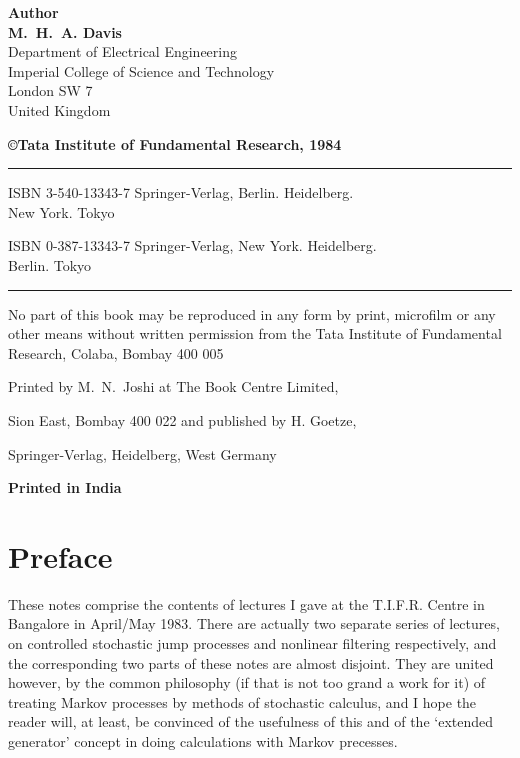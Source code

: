\thispagestyle{empty}
\begin{center}
{\bf Author}\\[15pt]
{\large\bf M.~H.~A. Davis}\\
{Department of Electrical Engineering}\\
{Imperial College of Science and Technology}\\
{London SW 7}\\
{United Kingdom}
\vfill

{\bf\copyright Tata Institute of Fundamental Research, 1984}
\vfill

\rule{\textwidth}{.5pt}

ISBN 3-540-13343-7 Springer-Verlag, Berlin. Heidelberg.\\ New York. Tokyo

ISBN 0-387-13343-7 Springer-Verlag, New York. Heidelberg.\\ Berlin. Tokyo

\rule{\textwidth}{.5pt}

\vfill


\parbox{0.7\textwidth}{
No part of this book may be reproduced in any form by print, microfilm
or any other means without written permission from the Tata Institute
of Fundamental Research, Colaba, Bombay 400 005}
\vfill

Printed by M.~N.~Joshi at The Book Centre Limited,

Sion East, Bombay 400 022 and published by H. Goetze,

Springer-Verlag, Heidelberg, West Germany


\vskip 1cm

{\bf Printed in India}
\end{center}
\eject

\chapter*{Preface}

These notes comprise the contents of lectures I gave at the
T.I.F.R. Centre in Bangalore in April/May 1983. There are actually two
separate series of lectures, on controlled stochastic jump processes
and nonlinear filtering respectively, and the corresponding two parts
of these notes are almost disjoint. They are united however, by the
common philosophy (if that is not too grand a work for it) of treating
Markov processes by methods of stochastic calculus, and I hope the
reader will, at least, be convinced of the usefulness of this and of
the `extended generator' concept in doing calculations with Markov
precesses.

